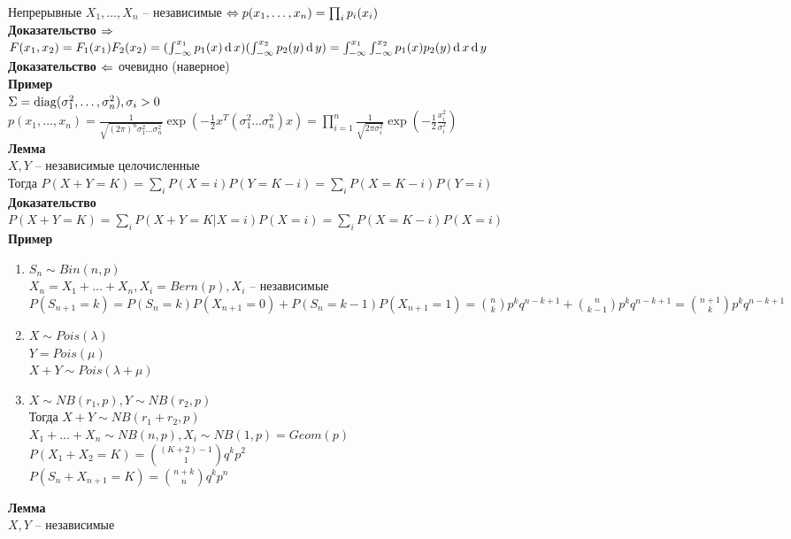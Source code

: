 \documentclass[12pt]{article}
\begin{document}
Непрерывные $X_1, \ldots, X_n$ -- независимые $\Leftrightarrow p(x_1, \ldots, x_n) = \prod_i p_i(x_i)$\\
\textbf{Доказательство $\Rightarrow$}\\
$F(x_1, x_2) = F_1(x_1) F_2(x_2) = (\int_{-\infty}^{x_1} p_1(x)\operatorname{d} x)(\int_{-\infty}^{x_2} p_2(y)\operatorname{d} y) = \int_{-\infty}^{x_1}\int_{-\infty}^{x_2} p_1(x)p_2(y)\operatorname{d} x \operatorname{d} y$\\
\textbf{Доказательство $\Leftarrow$} очевидно (наверное)\\
\textbf{Пример}\\
$\Sigma = \operatorname{diag}(\sigma^2_1, \ldots, \sigma^2_n), \sigma_i > 0$\\
$p(x_1, \ldots, x_n) = \frac1{\sqrt{(2\pi)^n \sigma^2_1\ldots \sigma^2_n}} \exp(-\frac12 x^T(\sigma^2_1\ldots \sigma^2_n)x) = \prod_{i=1}^{n} \frac{1}{\sqrt{2\pi \sigma^2_i}}\exp(-\frac12 \frac{x_i^2}{\sigma_i^2})$\\
\textbf{Лемма}\\
$X,Y$ -- независимые целочисленные\\
Тогда $P(X+Y=K)= \sum_i P(X=i)P(Y=K-i) = \sum_i P(X=K-i)P(Y=i)$\\
\textbf{Доказательство}\\
$P(X+Y=K) = \sum_i P(X+Y=K|X=i)P(X=i) = \sum_i P(X=K-i)P(X=i)$\\
\textbf{Пример}
\begin{enumerate}
    \item $S_n \sim Bin(n, p)$\\
    $X_n = X_1 + \ldots + X_n, X_i = Bern(p), X_i$ -- независимые\\
    $P(S_{n+1}=k) = P(S_n=k)P(X_{n+1}=0)+P(S_n=k-1)P(X_{n+1}=1) = \binom nk p^k q^{n-k+1} + \binom n{k-1}p^kq^{n-k+1} = \binom{n+1}k p^k q^{n-k+1}$
    \item $X \sim Pois(\lambda)$\\
    $Y = Pois(\mu)$\\
    $X+Y \sim Pois(\lambda+\mu)$
    \item $X \sim NB(r_1, p), Y \sim NB(r_2, p)$\\
    Тогда $X+Y \sim NB(r_1+r_2, p)$\\
    $X_1+\ldots+X_n \sim NB(n, p), X_i \sim NB(1, p) = Geom(p)$\\
    $P(X_1+X_2=K) = \binom{(K+2)-1}1 q^kp^2$\\
    $P(S_n+X_{n+1}=K) = \binom{n+k}n q^kp^n$
\end{enumerate}
\textbf{Лемма}\\
$X,Y$ -- независимые\\
\end{document}
